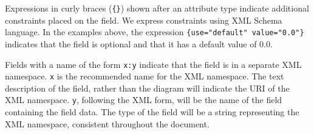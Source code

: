 \documentclass[10pt]{cekarticle}
\begin{document}
Expressions in curly braces (\texttt{\{\}}) shown after an
attribute type indicate additional constraints placed on the
field.  We express constraints using XML Schema language.  In the
examples above, the expression \texttt{\{use="default"
value="0.0"\}} indicates that the field  is
optional and that it has a default value of $0.0$.

Fields with a name of the form \texttt{x:y} indicate that the
field is in a separate XML namespace.  \texttt{x} is the
recommended name for the XML namespace.  The text description of
the field, rather than the diagram will indicate the URI of the
XML namespace. \texttt{y}, following the XML form, will be the
name of the field containing the field data.  The type of the
field will be a string representing the XML namespace, consistent
throughout the document.

%
%

\clearpage





\end{document}
